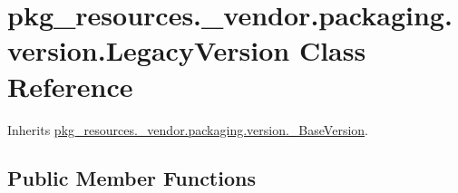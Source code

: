 \hypertarget{classpkg__resources_1_1__vendor_1_1packaging_1_1version_1_1_legacy_version}{}\section{pkg\+\_\+resources.\+\_\+vendor.\+packaging.\+version.\+Legacy\+Version Class Reference}
\label{classpkg__resources_1_1__vendor_1_1packaging_1_1version_1_1_legacy_version}


Inherits \hyperlink{classpkg__resources_1_1__vendor_1_1packaging_1_1version_1_1___base_version}{pkg\+\_\+resources.\+\_\+vendor.\+packaging.\+version.\+\_\+\+Base\+Version}.

\subsection*{Public Member Functions}
